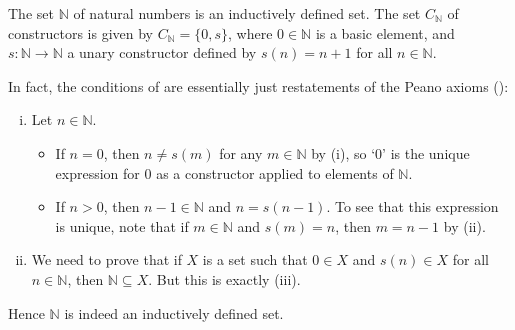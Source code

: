 \begin{example}
The set $\mathbb{N}$ of natural numbers is an inductively defined set. The set $C_{\mathbb{N}}$ of constructors is given by $C_{\mathbb{N}} = \{ 0, s \}$, where $0 \in \mathbb{N}$ is a basic element, and $s : \mathbb{N} \to \mathbb{N}$ a unary constructor defined by $s(n) = n+1$ for all $n \in \mathbb{N}$.

In fact, the conditions of  are essentially just restatements of the Peano axioms ():
\begin{enumerate}[(i)]
\item Let $n \in \mathbb{N}$.
\begin{itemize}
\item If $n = 0$, then $n \ne s(m)$ for any $m \in \mathbb{N}$ by (i), so `$0$' is the unique expression for $0$ as a constructor applied to elements of $\mathbb{N}$.
\item If $n > 0$, then $n-1 \in \mathbb{N}$ and $n=s(n-1)$. To see that this expression is unique, note that if $m \in \mathbb{N}$ and $s(m) = n$, then $m = n-1$ by (ii).
\end{itemize}
\item We need to prove that if $X$ is a set such that $0 \in X$ and $s(n) \in X$ for all $n \in \mathbb{N}$, then $\mathbb{N} \subseteq X$. But this is exactly (iii).
\end{enumerate}

Hence $\mathbb{N}$ is indeed an inductively defined set.
\end{example}


